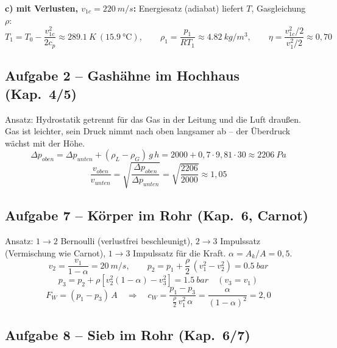 \documentclass[11pt,a4paper]{article}
\newenvironment{bild}{\par\medskip\noindent\begin{minipage}{\linewidth}\centering}{\end{minipage}\par\medskip}
\begin{document}
\textbf{c) mit Verlusten, $v_{1c} = \SI{220}{m/s}$:} Energiesatz (adiabat) liefert $T$, Gasgleichung $\rho$:
\[
T_1 = T_0 - \frac{v_{1c}^2}{2 c_p} \approx \SI{289.1}{K}\ (\SI{15.9}{\celsius}),
\qquad
\rho_1 = \frac{p_1}{R T_1} \approx \SI{4.82}{kg/m^3},
\qquad
\eta = \frac{v_{1c}^2/2}{v_1^2/2} \approx 0{,}70
\]

\subsection*{Aufgabe 2 -- Gashähne im Hochhaus (Kap.~4/5)}

\begin{bild}

\end{bild}

Ansatz: Hydrostatik getrennt für das Gas in der Leitung und die Luft draußen. Gas ist leichter, sein Druck nimmt nach oben langsamer ab -- der Überdruck wächst mit der Höhe.
\[
\Delta p_{oben} = \Delta p_{unten} + (\rho_L - \rho_G)\,g\,h = 2000 + 0{,}7\cdot 9{,}81\cdot 30 \approx \SI{2206}{Pa}
\]
\[
\frac{v_{oben}}{v_{unten}} = \sqrt{\frac{\Delta p_{oben}}{\Delta p_{unten}}} = \sqrt{\frac{2206}{2000}} \approx 1{,}05
\]

\subsection*{Aufgabe 7 -- Körper im Rohr (Kap.~6, Carnot)}

\begin{bild}

\end{bild}

Ansatz: $1\to2$ Bernoulli (verlustfrei beschleunigt), $2\to3$ Impulssatz (Vermischung wie Carnot), $1\to3$ Impulssatz für die Kraft. $\alpha = A_k/A = 0{,}5$.
\[
v_2 = \frac{v_1}{1 - \alpha} = \SI{20}{m/s},
\qquad
p_2 = p_1 + \frac{\rho}{2}\,(v_1^2 - v_2^2) = \SI{0.5}{bar}
\]
\[
p_3 = p_2 + \rho\left[v_2^2(1 - \alpha) - v_3^2\right] = \SI{1.5}{bar}\quad (v_3 = v_1)
\]
\[
F_W = (p_1 - p_3)\,A
\quad\Rightarrow\quad
c_W = \frac{p_1 - p_3}{\frac{\rho}{2}\,v_1^2\,\alpha} = \frac{\alpha}{(1 - \alpha)^2} = 2{,}0
\]

\subsection*{Aufgabe 8 -- Sieb im Rohr (Kap.~6/7)}

\begin{bild}

\end{bild}
\end{document}
